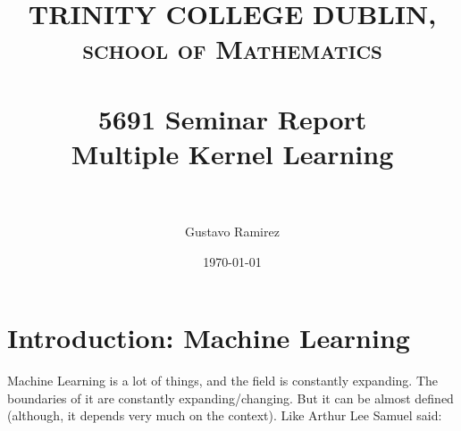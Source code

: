 \documentclass[paper=a4, fontsize=11pt]{scrartcl} %
\title{	
\normalfont \normalsize 
\textsc{TRINITY COLLEGE DUBLIN, school of Mathematics} \\ [25pt] %
\horrule{0.5pt} \\[0.4cm] %
\huge 5691 Seminar Report \\ Multiple Kernel Learning \\ %
\horrule{2pt} \\[0.5cm] %
}
\author{Gustavo Ramirez} %
\date{\normalsize\today} %
\numberwithin{equation}{section} %
\numberwithin{figure}{section} %
\numberwithin{table}{section} %
\begin{document}
\maketitle %

\newpage

\section{Introduction: Machine Learning}

Machine Learning is a lot of things, and the field is constantly expanding. The boundaries of it are constantly expanding/changing. But it can be almost defined (although, it depends very much on the context). Like Arthur Lee Samuel said:
\end{document}
